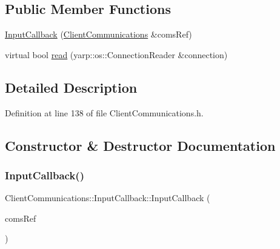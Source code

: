 \subsection*{Public Member Functions}
\begin{DoxyCompactItemize}
\item 
\hyperlink{classocra__recipes_1_1ClientCommunications_1_1InputCallback_aa5c33ecb3827af045af9b4206a0bfb31}{Input\+Callback} (\hyperlink{classocra__recipes_1_1ClientCommunications}{Client\+Communications} \&coms\+Ref)
\item 
virtual bool \hyperlink{classocra__recipes_1_1ClientCommunications_1_1InputCallback_ac35b3e10d832570b5559afd89d1a58c5}{read} (yarp\+::os\+::\+Connection\+Reader \&connection)
\end{DoxyCompactItemize}


\subsection{Detailed Description}


Definition at line 138 of file Client\+Communications.\+h.



\subsection{Constructor \& Destructor Documentation}
\hypertarget{classocra__recipes_1_1ClientCommunications_1_1InputCallback_aa5c33ecb3827af045af9b4206a0bfb31}{}\label{classocra__recipes_1_1ClientCommunications_1_1InputCallback_aa5c33ecb3827af045af9b4206a0bfb31} 
\subsubsection{\texorpdfstring{Input\+Callback()}{InputCallback()}}
{\footnotesize\ttfamily Client\+Communications\+::\+Input\+Callback\+::\+Input\+Callback (\begin{DoxyParamCaption}\item[{\hyperlink{classocra__recipes_1_1ClientCommunications}{Client\+Communications} \&}]{coms\+Ref }\end{DoxyParamCaption})}



